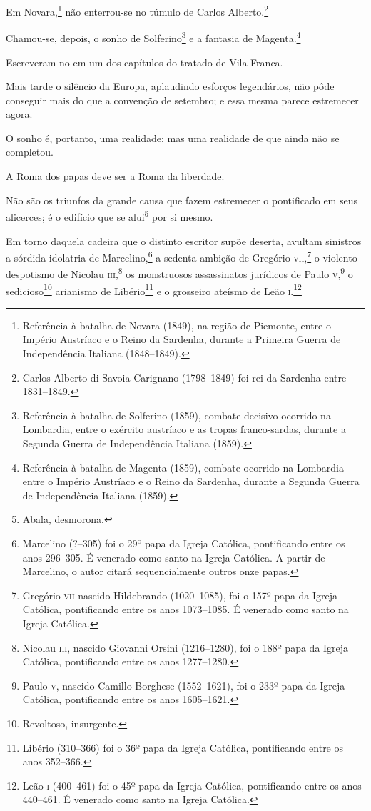 Em Novara,\footnote{Referência à batalha de Novara (1849), na região de
  Piemonte, entre o Império Austríaco e o Reino da Sardenha, durante a
  Primeira Guerra de Independência Italiana (1848--1849).} não
enterrou-se no túmulo de Carlos Alberto.\footnote{Carlos Alberto di
  Savoia-Carignano (1798--1849) foi rei da Sardenha entre 1831--1849.}

Chamou-se, depois, o sonho de Solferino\footnote{Referência à batalha
  de Solferino (1859), combate decisivo ocorrido na Lombardia, entre o
  exército austríaco e as tropas franco-sardas, durante a Segunda Guerra
  de Independência Italiana (1859).} e a fantasia de Magenta.\footnote{
  Referência à batalha de Magenta (1859), combate ocorrido na Lombardia
  entre o Império Austríaco e o Reino da Sardenha, durante a Segunda
  Guerra de Independência Italiana (1859).}

Escreveram-no em um dos capítulos do tratado de Vila Franca.

Mais tarde o silêncio da Europa, aplaudindo esforços legendários, não
pôde conseguir mais do que a convenção de setembro; e essa mesma parece
estremecer agora.

O sonho é, portanto, uma realidade; mas uma realidade de que ainda não
se completou. %

A Roma dos papas deve ser a Roma da liberdade.

Não são os triunfos da grande causa que fazem estremecer o pontificado
em seus alicerces; é o edifício que se alui\footnote{Abala, desmorona.}
por si mesmo.

Em torno daquela cadeira que o distinto escritor supõe deserta, avultam
sinistros a sórdida idolatria de Marcelino,\footnote{Marcelino (?--305)
  foi o 29º papa da Igreja Católica, pontificando entre os anos 296--305.
  É venerado como santo na Igreja Católica. A partir de Marcelino, o
  autor citará sequencialmente outros onze papas.} a sedenta ambição de
Gregório \textsc{vii},\footnote{Gregório \textsc{vii} nascido Hildebrando (1020--1085),
  foi o 157º papa da Igreja Católica, pontificando entre os anos
  1073--1085. É venerado como santo na Igreja Católica.} o violento
despotismo de Nicolau \textsc{iii},\footnote{Nicolau \textsc{iii}, nascido Giovanni
  Orsini (1216--1280), foi o 188º papa da Igreja Católica, pontificando
  entre os anos 1277--1280.} os monstruosos assassinatos jurídicos de
Paulo \textsc{v},\footnote{Paulo \textsc{v}, nascido Camillo Borghese (1552--1621), foi o
  233º papa da Igreja Católica, pontificando entre os anos 1605--1621.}
o sedicioso\footnote{Revoltoso, insurgente.} arianismo de
Libério\footnote{Libério (310--366) foi o 36º papa da Igreja Católica,
  pontificando entre os anos 352--366.} e o grosseiro ateísmo de
Leão \textsc{i}.\footnote{Leão \textsc{i} (400--461) foi o 45º papa da Igreja Católica,
  pontificando entre os anos 440--461. É venerado como santo na Igreja
  Católica.}

